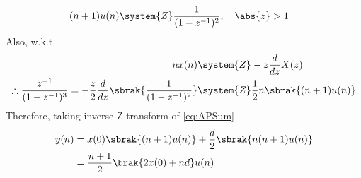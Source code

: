 \begin{enumerate}[label=\thechapter.\arabic*,ref=\thechapter.\theenumi]
\begin{align}
(n+1) u(n) &\system{Z} \frac{1}{({1-z^{-1}})^2}, \quad \abs{z} > 1
\end{align}
Also, w.k.t
\begin{align}
nx(n) &\system{Z} -z\frac{d}{dz}X(z)\\
\therefore \frac{z^{-1}}{(1-z^{-1})^{3}} = -\frac{z}{2}\frac{d}{dz}\sbrak{\frac{1}{(1-z^{-1})^{2}}} &\system{Z} \frac{1}{2}n\sbrak{(n+1)u(n)}
\end{align}
Therefore, taking inverse Z-transform of \eqref{eq:APSum}
\begin{align}
y(n) &= x(0)\sbrak{(n + 1)u(n)} + \frac{d}{2}\sbrak{n(n + 1)u(n)}\\
&= \frac{n+1}{2}\brak{2x(0) + nd}u(n)
\end{align}
\end{enumerate}
